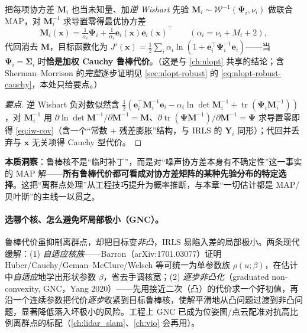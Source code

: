 \begin{theorem}[（选读）鲁棒核 $=$ 协方差逆 Wishart 先验下的 MAP]\label{thm:robust-iw}
把每项协方差 $\mathbf{M}_i$ 也当未知量、加\emph{逆 Wishart} 先验 $\mathbf{M}_i\sim\mathcal{W}^{-1}(\boldsymbol{\Psi}_i,\nu_i)$ 做联合 MAP，对 $\mathbf{M}_i^{-1}$ 求导置零得最优协方差
\begin{equation}
  \mathbf{M}_i(\mathbf{x})=\tfrac{1}{\alpha_i}\boldsymbol{\Psi}_i+\tfrac{1}{\alpha_i}\mathbf{e}_i(\mathbf{x})\mathbf{e}_i(\mathbf{x})^\top\qquad(\alpha_i=\nu_i+M_i+2),
  \label{eq:iw-cov}
\end{equation}
代回消去 $\mathbf{M}$，目标函数化为 $J'(\mathbf{x})=\tfrac12\sum_i\alpha_i\ln(1+\mathbf{e}_i^\top\boldsymbol{\Psi}_i^{-1}\mathbf{e}_i)$——当 $\boldsymbol{\Psi}_i=\boldsymbol{\Sigma}_i$ 时\textbf{恰是加权 Cauchy 鲁棒代价}。（这是与 \cref{ch:nlopt} 共享的结论；含 Sherman--Morrison 的\emph{完整}逐步证明见 \cref{sec:nlopt-robust} 的 \cref{eq:nlopt-robust-cauchy}，本处只给要点。）
\end{theorem}
\begin{proof}[要点]
逆 Wishart 负对数似然含 $\tfrac12(\mathbf{e}_i^\top\mathbf{M}_i^{-1}\mathbf{e}_i-\alpha_i\ln\det\mathbf{M}_i^{-1}+\operatorname{tr}(\boldsymbol{\Psi}_i\mathbf{M}_i^{-1}))$，对 $\mathbf{M}_i^{-1}$ 用 $\partial\ln\det\mathbf{M}^{-1}/\partial\mathbf{M}^{-1}=\mathbf{M}$、$\partial\operatorname{tr}(\boldsymbol{\Psi}\mathbf{M}^{-1})/\partial\mathbf{M}^{-1}=\boldsymbol{\Psi}$ 求导置零即得 \cref{eq:iw-cov}（含一个“常数 $+$ 残差膨胀”结构，与 IRLS 的 $\mathbf{Y}_i$ 同形）；代回并丢弃与 $\mathbf{x}$ 无关项得 Cauchy 型代价\cite{barfoot2024state}。
\end{proof}

\begin{insight}
\textbf{本质洞察}：鲁棒核不是“临时补丁”，而是对“噪声协方差本身有不确定性”这一事实的 MAP 解——\textbf{所有鲁棒代价都可看成对协方差矩阵的某种先验分布的特定选择}\cite{barfoot2024state}。这把“离群点处理”从工程技巧提升为概率推断，与本章“一切估计都是 MAP/贝叶斯”的主线一以贯之。
\end{insight}

\paragraph{选哪个核、怎么避免坏局部极小（GNC）。}
鲁棒代价虽抑制离群点，却把目标变\emph{非凸}，IRLS 易陷入差的局部极小。两条现代缓解\cite{barfoot2024state}：(1) \emph{自适应核族}——Barron（arXiv:1701.03077）证明 Huber/Cauchy/Geman--McClure/Welsch 等可统一为单参数族 $\rho(u;\beta)$，在估计中\emph{自适应}地学出形状参数 $\beta$，省去手调核宽\cite{barron2019general}；(2) \emph{逐步非凸化}（graduated non-convexity, GNC，Yang 2020\cite{yang2020gnc}）——先用接近二次（凸）的代价求一个好初值，再沿一个连续参数把代价\emph{逐步}收紧到目标鲁棒核，使解平滑地从凸问题过渡到非凸问题，显著降低落入坏极小的风险。工程上 GNC 已成为位姿图/点云配准对抗高比例离群点的标配（\cref{ch:lidar_slam}、\cref{ch:vio} 会再用）。

